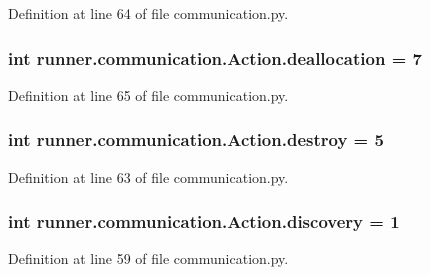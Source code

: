 Definition at line 64 of file communication.\+py.

\hypertarget{classrunner_1_1communication_1_1Action_a1bfe79592d0366af56e56c471a424934}{}
\subsubsection[{deallocation}]{\setlength{\rightskip}{0pt plus 5cm}int runner.\+communication.\+Action.\+deallocation = 7\hspace{0.3cm}{\ttfamily [static]}}\label{classrunner_1_1communication_1_1Action_a1bfe79592d0366af56e56c471a424934}


Definition at line 65 of file communication.\+py.

\hypertarget{classrunner_1_1communication_1_1Action_ae28864e7f871e01df3998a8029029540}{}
\subsubsection[{destroy}]{\setlength{\rightskip}{0pt plus 5cm}int runner.\+communication.\+Action.\+destroy = 5\hspace{0.3cm}{\ttfamily [static]}}\label{classrunner_1_1communication_1_1Action_ae28864e7f871e01df3998a8029029540}


Definition at line 63 of file communication.\+py.

\hypertarget{classrunner_1_1communication_1_1Action_a14f5037ec1180956c92722021f57b3be}{}
\subsubsection[{discovery}]{\setlength{\rightskip}{0pt plus 5cm}int runner.\+communication.\+Action.\+discovery = 1\hspace{0.3cm}{\ttfamily [static]}}\label{classrunner_1_1communication_1_1Action_a14f5037ec1180956c92722021f57b3be}


Definition at line 59 of file communication.\+py.

